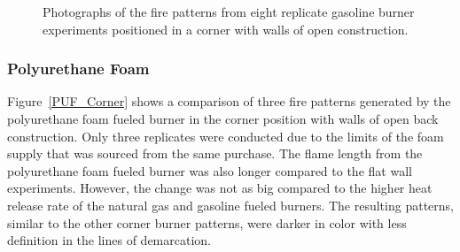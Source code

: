 \documentclass[twoside]{uocthesis}
\begin{document}
{\begin{figure}[p]
	\caption[Photographs of the fire patterns from eight replicate gasoline burner experiments positioned in a corner.]{Photographs of the fire patterns from eight replicate gasoline burner experiments positioned in a corner with walls of open construction.}
	\label{Gas_Corner}
\end{figure}

\subsubsection{Polyurethane Foam}

Figure~\ref{PUF_Corner} shows a comparison of three fire patterns generated by the polyurethane foam fueled burner in the corner position with walls of open back construction. Only three replicates were conducted due to the limits of the foam supply that was sourced from the same purchase.  The flame length from the polyurethane foam fueled burner was also longer compared to the flat wall experiments.  However, the change was not as big compared to the higher heat release rate of the natural gas and gasoline fueled burners.  The resulting patterns, similar to the other corner burner patterns, were darker in color with less definition in the lines of demarcation.       

}
\end{document}
